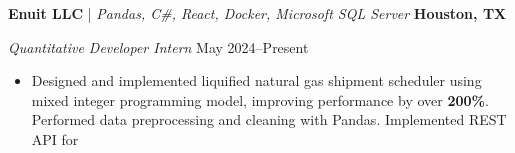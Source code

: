 \textbf{Enuit LLC} | \textit{Pandas, C\#, React, Docker, Microsoft SQL Server} \hfill \textbf{Houston, TX}\par
\textit{Quantitative Developer Intern} \hfill May 2024--Present

\begin{itemize}
	\item Designed and implemented liquified natural gas shipment scheduler using mixed integer programming model, improving performance by over \textbf{200\%}. Performed data preprocessing and cleaning with Pandas. Implemented REST API for 
\end{itemize}\par